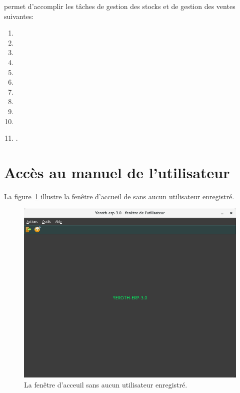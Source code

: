 \yeren permet d'accomplir les t\^aches de gestion
des stocks et de gestion des ventes suivantes:
\begin{enumerate}[1)]
	\item {}	
	\item {}	
	\item {}
	\item {}
	\item {}
	\item {}	
	\item {}
	\item {}	
	\item {}	
	\item {}
	\item {}.\\
\end{enumerate}

\newpage

\section{Acc\`es au manuel de l'utilisateur}

La figure~\ref{fig:fenetre-principale-utilisateur-non-enregistre}
illustre la fen\^etre d'accueil de \yeren sans aucun utilisateur
enregistr\'e.\\

\begin{figure}[!htbp]
\centering
\includegraphics[scale=0.63]{images/yeren-fenetre-principale.png}
\caption{La fen\^etre d'acceuil sans aucun utilisateur enregistr\'e.}
\label{fig:fenetre-principale-utilisateur-non-enregistre}
\end{figure}

